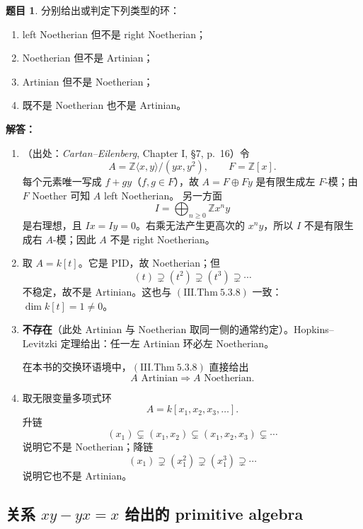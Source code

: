 \documentclass[a4paper]{ctexart}
\theoremstyle{definition}
\newtheorem{example}{题目}[section]
\theoremstyle{analysis}
\theoremstyle{plain}
\begin{document}
\begin{example}
分别给出或判定下列类型的环：
\begin{enumerate}
  \item left Noetherian 但不是 right Noetherian；
  \item Noetherian 但不是 Artinian；
  \item Artinian 但不是 Noetherian；
  \item 既不是 Noetherian 也不是 Artinian。
\end{enumerate}

\textbf{解答：}

\begin{enumerate}
  \item （出处：\textit{Cartan--Eilenberg}, Chapter I, \S7, p.~16）令
  \[
    A=\mathbb Z\langle x,y\rangle/(yx,y^2),
    \qquad F=\mathbb Z[x].
  \]
  每个元素唯一写成 \(f+gy\)（\(f,g\in F\)），故 \(A=F\oplus Fy\) 是有限生成左 \(F\)-模；由 \(F\) Noether 可知 \(A\) left Noetherian。
  另一方面
  \[
    I=\bigoplus_{n\geq0}\mathbb Z x^ny
  \]
  是右理想，且 \(Ix=Iy=0\)。右乘无法产生更高次的 \(x^ny\)，所以 \(I\) 不是有限生成右 \(A\)-模；因此 \(A\) 不是 right Noetherian。

  \item 取 \(A=k[t]\)。它是 PID，故 Noetherian；但
  \[
    (t)\supsetneq(t^2)\supsetneq(t^3)\supsetneq\cdots
  \]
  不稳定，故不是 Artinian。这也与 \((\mathrm{III.Thm}\ 5.3.8)\) 一致：\(\dim k[t]=1\neq0\)。

  \item \textbf{不存在}（此处 Artinian 与 Noetherian 取同一侧的通常约定）。Hopkins--Levitzki 定理给出：任一左 Artinian 环必左 Noetherian。

  在本书的交换环语境中，\((\mathrm{III.Thm}\ 5.3.8)\) 直接给出
  \[
    A\text{ Artinian}\Longrightarrow A\text{ Noetherian}.
  \]

  \item 取无限变量多项式环
  \[
    A=k[x_1,x_2,x_3,\ldots].
  \]
  升链
  \[
    (x_1)\subsetneq(x_1,x_2)\subsetneq(x_1,x_2,x_3)\subsetneq\cdots
  \]
  说明它不是 Noetherian；降链
  \[
    (x_1)\supsetneq(x_1^2)\supsetneq(x_1^3)\supsetneq\cdots
  \]
  说明它也不是 Artinian。
\end{enumerate}
\end{example}

\subsection{\texorpdfstring{关系 \(xy-yx=x\) 给出的 primitive algebra}{关系 xy-yx=x 给出的 primitive algebra}}\label{subsec:problem-primitive-xy-yx-x}
\end{document}
